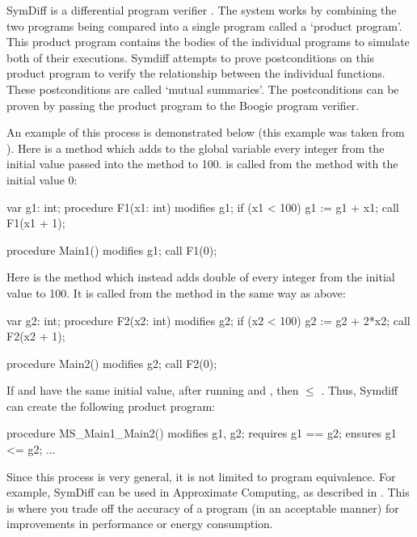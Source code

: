 SymDiff is a differential program verifier \parencite{lahiriSYMDIFFLanguageAgnosticSemantic2012}. The system works by combining the two programs being compared into a single program called a `product program'. This product program contains the bodies of the individual programs to simulate both of their executions. Symdiff attempts to prove postconditions on this product program to verify the relationship between the individual functions. These postconditions are called `mutual summaries'. The postconditions can be proven by passing the product program to the Boogie program verifier.

An example of this process is demonstrated below (this example was taken from \textcite{haran2015automated}). Here is a method  which adds to the global variable  every integer from the initial value passed into the  method to 100.  is called from the  method with the initial value 0:
\begin{boogie}
var g1: int;
procedure F1(x1: int)
  modifies g1;
{
  if (x1 < 100) {
    g1 := g1 + x1;
    call F1(x1 + 1);
  }
}

procedure Main1()
  modifies g1;
{
  call F1(0);
}
\end{boogie}
%
Here is the method  which instead adds double of every integer from the initial value to 100. It is called from the  method in the same way as above:
\begin{boogie}
var g2: int;
procedure F2(x2: int)
  modifies g2;
{
  if (x2 < 100) {
    g2 := g2 + 2*x2;
    call F2(x2 + 1);
  }
}

procedure Main2()
  modifies g2;
{
  call F2(0);
}
\end{boogie}
%
If  and  have the same initial value, after running  and , then  \(\leq\) . Thus, Symdiff can create the following product program:

\begin{boogie}
procedure MS_Main1_Main2()
  modifies g1, g2;
  requires g1 == g2;
  ensures g1 <= g2;
{
...
}
\end{boogie}
%
Since this process is very general, it is not limited to program equivalence. For example, SymDiff can be used in Approximate Computing, as described in \textcite{haran2015automated}. This is where you trade off the accuracy of a program (in an acceptable manner) for improvements in performance or energy consumption.

